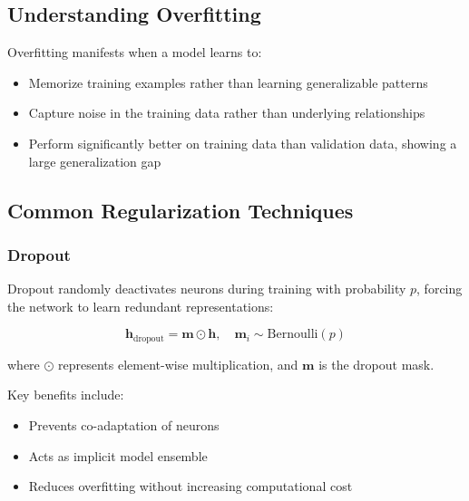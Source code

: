 \subsection{Understanding Overfitting}
\noindent
Overfitting manifests when a model learns to:
\begin{itemize}
    \item Memorize training examples rather than learning generalizable patterns
    \item Capture noise in the training data rather than underlying relationships
    \item Perform significantly better on training data than validation data, showing a large generalization gap
\end{itemize}

\subsection{Common Regularization Techniques}

\subsubsection{Dropout}
\noindent
Dropout randomly deactivates neurons during training with probability $p$, forcing the network to learn redundant representations:

\begin{equation}
\mathbf{h}_\text{dropout} = \mathbf{m} \odot \mathbf{h}, \quad \mathbf{m}_i \sim \text{Bernoulli}(p)
\end{equation}

where $\odot$ represents element-wise multiplication, and $\mathbf{m}$ is the dropout mask.

Key benefits include:
\begin{itemize}
    \item Prevents co-adaptation of neurons
    \item Acts as implicit model ensemble
    \item Reduces overfitting without increasing computational cost
\end{itemize}

